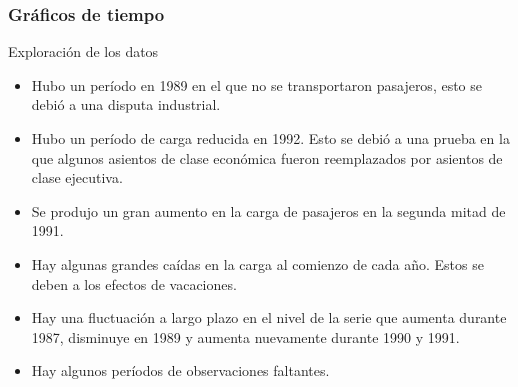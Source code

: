 \documentclass[10pt]{beamer}
\begin{document}





\begin{frame}[fragile]
\frametitle{Gráficos de tiempo}

{\small
\begin{block}{Exploración de los datos}
\begin{itemize}
\item Hubo un período en 1989 en el que no se transportaron pasajeros, esto se debió a una disputa industrial.
\item Hubo un período de carga reducida en 1992. Esto se debió a una prueba en la que algunos asientos de clase económica fueron reemplazados por asientos de clase ejecutiva.
\item Se produjo un gran aumento en la carga de pasajeros en la segunda mitad de 1991.
\item Hay algunas grandes caídas en la carga al comienzo de cada año. Estos se deben a los efectos de vacaciones.
\item Hay una fluctuación a largo plazo en el nivel de la serie que aumenta durante 1987, disminuye en 1989 y aumenta nuevamente durante 1990 y 1991.
\item Hay algunos períodos de observaciones faltantes.
\end{itemize}
\end{block}
}
\end{frame}


\end{document}
